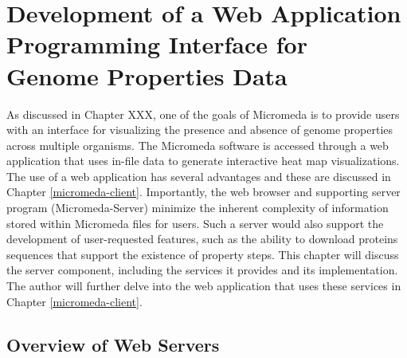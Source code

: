 \chapter{Development of a Web Application Programming Interface for Genome Properties Data} \label{micromeda-server}

As discussed in Chapter XXX, one of the goals of Micromeda is to provide users with an interface for visualizing the presence and absence of genome properties across multiple organisms. The Micromeda software is accessed through a web application that uses in-file data to generate interactive heat map visualizations. The use of a web application has several advantages and these are discussed in Chapter \ref{micromeda-client}. Importantly, the web browser and supporting server program (Micromeda-Server) minimize the inherent complexity of information stored within Micromeda files for users. Such a server would also support the development of user-requested features, such as the ability to download proteins sequences that support the existence of property steps. This chapter will discuss the server component, including the services it provides and its implementation. The author will further delve into the web application that uses these services in Chapter \ref{micromeda-client}.

\section{Overview of Web Servers} \label{web-servers}

